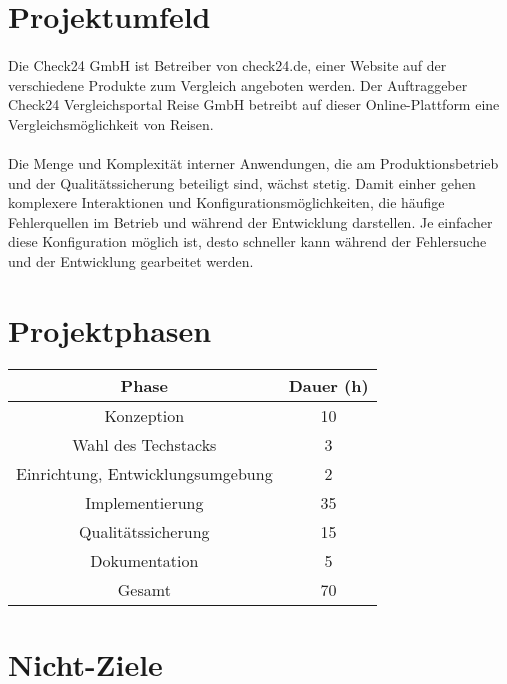 \documentclass[a4paper,11pt]{article}
\begin{document}
\section{Projektumfeld}
\paragraph{}
Die Check24 GmbH ist Betreiber von check24.de, einer Website auf der verschiedene
Produkte zum Vergleich angeboten werden. Der Auftraggeber Check24 Vergleichsportal
Reise GmbH betreibt auf dieser Online-Plattform eine Vergleichsmöglichkeit von
Reisen.
\paragraph{}
Die Menge und Komplexität interner Anwendungen, die am Produktionsbetrieb
und der Qualitätssicherung beteiligt sind, wächst stetig. Damit einher gehen
komplexere Interaktionen und Konfigurationsmöglichkeiten, die häufige
Fehlerquellen im Betrieb und während der Entwicklung darstellen. Je einfacher
diese Konfiguration möglich ist, desto schneller kann während der Fehlersuche
und der Entwicklung gearbeitet werden.

\section{Projektphasen}


\begin{tabularx}{0.8\textwidth}{ c | c }
	\textbf{Phase}                    & \textbf{Dauer (h)} \\ \hline
	Konzeption                        & 10                 \\ \hline
	Wahl des Techstacks               & 3                  \\ \hline
	Einrichtung, Entwicklungsumgebung & 2                  \\ \hline
	Implementierung                   & 35                 \\ \hline
	Qualitätssicherung                & 15                 \\ \hline
	Dokumentation                     & 5                  \\ \hline
	Gesamt                            & 70
\end{tabularx}


\section{Nicht-Ziele}
\end{document}
